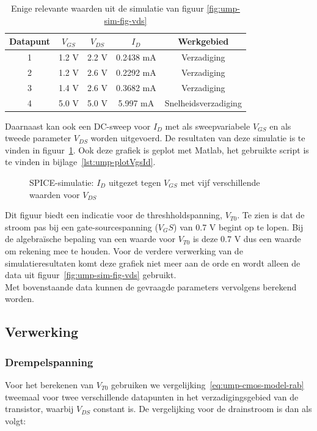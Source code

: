 \documentclass{scrartcl}
\begin{document}
\begin{table}[H]
	\centering
	\caption{Enige relevante waarden uit de simulatie van figuur \ref{fig:ump-sim-fig-vds}}
	\label{tab:ump-sim-tab-vds}
	\begin{tabular}{|c|c|c|c|c|} 	
		\hline
		Datapunt & $V_{GS}$ & $V_{DS}$ & $I_{D}$ & Werkgebied \\
		\hline
		1 & 1.2 V & 2.2 V & 0.2438 mA & Verzadiging \\
		\hline
		2 & 1.2 V & 2.6 V & 0.2292 mA & Verzadiging \\
		\hline
		3 & 1.4 V & 2.6 V & 0.3682 mA & Verzadiging \\
		\hline
		4 & 5.0 V & 5.0 V & 5.997 mA & Snelheidsverzadiging \\
		\hline	
	\end{tabular}
\end{table}

Daarnaast kan ook een DC-sweep voor $I_{D}$ met als sweepvariabele $V_{GS}$ en als tweede parameter $V_{DS}$ worden uitgevoerd. De resultaten van deze simulatie is te vinden in figuur~\ref{fig:ump-sim-fig-vgs}. Ook deze grafiek is geplot met Matlab, het gebruikte script is te vinden in bijlage~\ref{lst:ump-plotVgsId}.

\begin{figure}[H]
	\centering
	\setlength{} 
	\setlength{}
	
	\caption{SPICE-simulatie: $I_{D}$ uitgezet tegen $V_{GS}$ met vijf verschillende waarden voor $V_{DS}$}
	\label{fig:ump-sim-fig-vgs}
\end{figure}

Dit figuur biedt een indicatie voor de threshholdspanning, $V_{T0}$. Te zien is dat de stroom pas bij een gate-sourcespanning ($V_GS$) van 0.7 V begint op te lopen. Bij de algebraïsche bepaling van een waarde voor $V_{T0}$ is deze 0.7 V dus een waarde om rekening mee te houden. Voor de verdere verwerking van de simulatieresultaten komt deze grafiek niet meer aan de orde en wordt alleen de data uit figuur~\ref{fig:ump-sim-fig-vds} gebruikt.
\\

Met bovenstaande data kunnen de gevraagde parameters vervolgens berekend worden.

\subsection{Verwerking}
\label{subsec:ump-methode-verw}
\subsubsection{Drempelspanning}
\label{subsubsec:ump-methode-verw-vt0}
Voor het berekenen van $V_{T0}$ gebruiken we vergelijking~\ref{eq:ump-cmos-model-rab} tweemaal voor twee verschillende datapunten in het verzadigingsgebied van de transistor, waarbij $V_{DS}$ constant is. De vergelijking voor de drainstroom is dan als volgt:
\end{document}
